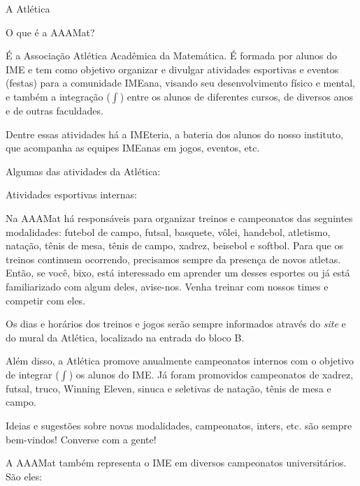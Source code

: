 \begin{secao}{A Atlética}

\begin{subsecao}{O que é a AAAMat?}

É a Associação Atlética Acadêmica da Matemática. É formada por alunos do IME e
tem como objetivo organizar e divulgar atividades esportivas e eventos (festas)
para a comunidade IMEana, visando seu desenvolvimento físico e mental,
e também a integração ($\int$) entre os alunos de diferentes cursos, de diversos
anos e de outras faculdades.

Dentre essas atividades há a IMEteria, a bateria dos alunos do nosso instituto,
que acompanha as equipes IMEanas em jogos, eventos, etc.

\end{subsecao}

Algumas das atividades da Atlética:

\begin{subsecao}{Atividades esportivas internas:}

Na AAAMat há responsáveis para organizar treinos e campeonatos das seguintes 
modalidades: futebol de campo, futsal, basquete, vôlei, handebol, atletismo, 
natação, tênis de mesa, tênis de campo, xadrez, beisebol e softbol. Para 
que os treinos continuem ocorrendo, precisamos sempre da presença de novos 
atletas. Então, se você, bixo, está interessado em aprender um desses 
esportes ou já está familiarizado com algum deles, avise-nos. Venha treinar com nossos times e competir com eles.

Os dias e horários dos treinos e jogos serão sempre informados através do \textit{site}
e do mural da Atlética, localizado na entrada do bloco B.

Além disso, a Atlética promove anualmente campeonatos internos com o objetivo de
integrar ($\int$) os alunos do IME. Já foram promovidos campeonatos de xadrez,
futsal, truco, Winning Eleven, sinuca e seletivas de natação, tênis de mesa e 
campo.

Ideias e sugestões sobre novas modalidades, campeonatos, inters, etc. são sempre
 bem-vindos! Converse com a gente!

\end{subsecao}

A AAAMat também representa o IME em diversos campeonatos universitários. São
eles:


\end{secao}
